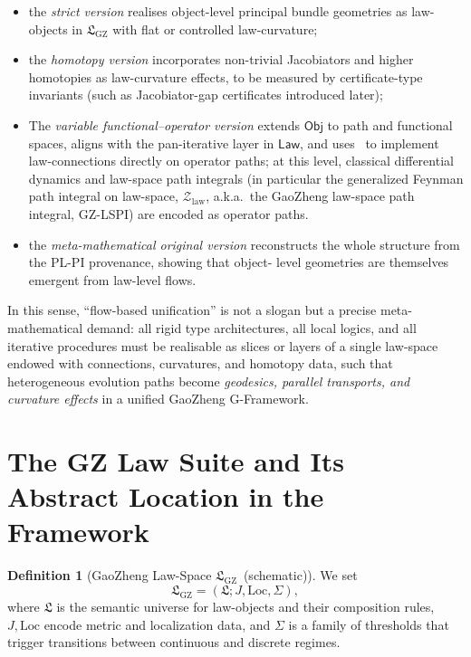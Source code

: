 \documentclass[11pt]{book}
\theoremstyle{plain}
\theoremstyle{definition}
\newtheorem{definition}[theorem]{Definition} \theoremstyle{remark}
\newcommand{\GZLS}{\ensuremath{\mathfrak{L}_{\mathrm{GZ}}}}       \newcommand{\GZLT}{\ensuremath{M_{!w}}}                           \newcommand{\GZLOC}{\ensuremath{A_M}}                             \newcommand{\GZLCurv}{\ensuremath{\mathcal{F}_{\mathrm{law}}}}
\begin{document}
\begin{itemize}
  \item the \emph{strict version} realises object-level principal bundle
        geometries as law-objects in $\GZLS$ with flat or controlled
        law-curvature;
  \item the \emph{homotopy version} incorporates non-trivial Jacobiators
        and higher homotopies as law-curvature effects, to be measured
        by certificate-type invariants (such as Jacobiator-gap
        certificates introduced later);
  \item The \emph{variable functional–operator version} extends
        $\mathsf{Obj}$ to path and functional spaces, aligns with the
        pan-iterative layer in $\mathsf{Law}$, and uses \GZTLC\ to
        implement law-connections directly on operator paths; at this
        level, classical differential dynamics and law-space path
        integrals (in particular the generalized Feynman path integral
        on law-space, $\mathcal{Z}_{\mathrm{law}}$, a.k.a.\ the
        GaoZheng law-space path integral, GZ-LSPI) are encoded as
        operator paths.
\item the \emph{meta-mathematical original version} reconstructs the
        whole structure from the PL-PI provenance, showing that object-
        level geometries are themselves emergent from law-level flows.
\end{itemize}

In this sense, “flow-based unification” is not a slogan but a precise
meta-mathematical demand: all rigid type architectures, all local
logics, and all iterative procedures must be realisable as slices or
layers of a single law-space endowed with connections, curvatures, and
homotopy data, such that heterogeneous evolution paths become
\emph{geodesics, parallel transports, and curvature effects} in a
unified GaoZheng G-Framework.



\section{The GZ Law Suite and Its Abstract Location in the Framework}


\begin{definition}[GaoZheng Law-Space \GZLS\ (schematic)]
We set
  \[
    \GZLS = (\mathfrak{L}; J,\mathrm{Loc},\Sigma),
  \]
  where $\mathfrak{L}$ is the semantic universe for law-objects and their composition rules,
  $J,\mathrm{Loc}$ encode metric and localization data, and $\Sigma$ is a family of thresholds
  that trigger transitions between continuous and discrete regimes.
\end{definition}
\end{document}
